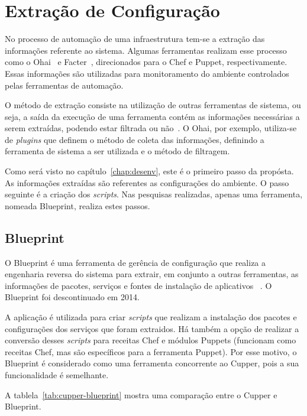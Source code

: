\section{Extração de Configuração}

No processo de automação de uma infraestrutura tem-se a extração das
informações referente ao sistema. Algumas ferramentas realizam esse
processo como o Ohai~\cite{ohaidoc:2016} e Facter~\cite{facterdoc:2016},
direcionados para o Chef e Puppet, respectivamente. Essas informações
são utilizadas para monitoramento do ambiente controlados pelas ferramentas
de automação.

O método de extração consiste na utilização de outras ferramentas de sistema,
ou seja, a saída da execução de uma ferramenta contém as informações necessárias
a serem extraídas, podendo estar filtrada ou não~\cite{ohaidoc:2016}. O Ohai,
por exemplo, utiliza-se de \textit{plugins} que definem o método de coleta das informações,
definindo a ferramenta de sistema a ser utilizada e o método de filtragem.

Como será visto no capítulo~\ref{chap:desenv}, este é o primeiro passo da propósta.
As informações extraídas são referentes as configurações do ambiente. O passo
seguinte é a criação dos \textit{scripts}. Nas pesquisas realizadas, apenas uma ferramenta,
nomeada Blueprint, realiza estes passos.

\subsection{Blueprint}

O Blueprint é uma ferramenta de gerência de configuração que realiza a
engenharia reversa do sistema para extrair, em conjunto a outras ferramentas,
as informações de pacotes, serviços e fontes de instalação de aplicativos
~\cite{blueprint:2016}. O Blueprint foi descontinuado em 2014.

A aplicação é utilizada para criar \textit{scripts} que realizam
a instalação dos pacotes e configurações dos serviços que foram extraidos. Há
também a opção de realizar a conversão desses \textit{scripts} para receitas Chef e módulos
Puppets (funcionam como receitas Chef, mas são específicos para a ferramenta Puppet).
Por esse motivo, o Blueprint é considerado como uma ferramenta concorrente ao Cupper,
pois a sua funcionalidade é semelhante.

A tablela~\ref{tab:cupper-blueprint} mostra uma comparação entre o Cupper e Blueprint.

